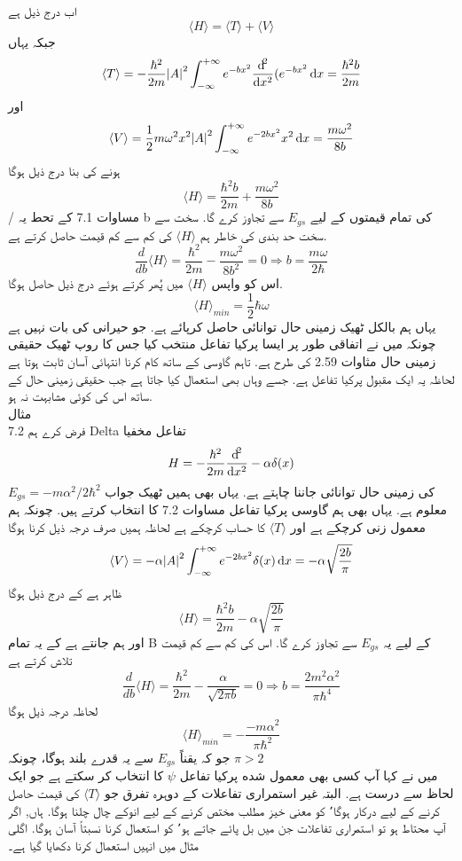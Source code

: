 اب درج ذیل ہے
 \[ \langle H \rangle=\langle T \rangle + \langle V \rangle\]
جبکہ یہاں
\[\langle T \rangle=-\frac{\hbar^{2}}{2m}\abs{A}^{2}\int_{-\infty}^{+\infty}e^{-bx^{2}}\frac{\dif^{2}}{\dif{x^{2}}}(e^{-bx^{2}}\dif{x}=\frac{\hbar^{2}b}{2m}\]
اور
\[\langle V\rangle=\frac{1}{2}m\omega^{2}x^{2}\abs{A}^{2}\int_{-\infty}^{+\infty}e^{-2bx^{2}}x^{2}\dif{x}=\frac{m\omega^{2}}{8b}\]
ہونے کی بنا درج ذیل ہوگا
\[ \langle H \rangle=\frac{\hbar^{2}b}{2m}+\frac{m\omega^{2}}{8b}\]
/
مساوات 7.1 کے تحط یہ b کی تمام قیمتوں کے لیے
\(E_{gs}\)
 سے تجاوز کرے گا. سخت سے سخت حد بندی کی خاطر ہم
 \( \langle H\rangle\)
 کی کم سے کم قیمت حاصل کرتے ہے.
\[\frac{d}{db}\langle H\rangle=\frac{\hbar^{2}}{2m}-\frac{m\omega^{2}}{8b^{2}}=0\Rightarrow b=\frac{m\omega}{2\hbar}\]
اس کو واپس
 \( \langle H\rangle \)
میں پُھر کرتے ہوئے درج ذیل حاصل ہوگا.
 \[\langle H\rangle _{min} =\frac{1}{2}\hbar\omega\]
یہاں ہم بالکل ٹھیک زمینی حال توانائی حاصل کرپائے ہے. جو حیرانی کی بات نہیں ہے چونکہ میں نے اتفاقی طور پر ایسا پرکیا تفاعل منتخب کیا جس کا روپ ٹھیک حقیقی  زمینی حال مثاوات 2.59 کی طرح ہے.   تاہم گاوسی کے ساتھ کام کرنا انتہائی آسان ثابت ہوتا ہے لحاظہ یہ ایک مقبول پرکیا تفاعل ہے. جسے وہاں بھی استعمال کیا جاتا ہے جب حقیقی زمینی حال کے ساتھ اس کی کوئی مشابہت نہ ہو.\\
مثال \\7.2
فرض کرے ہم Delta تفاعل مخفیا
\[H=-\frac{\hbar^{2}}{2m}\frac{\dif^{2}}{\dif{x^{2}}}-\alpha\delta(x)\]
کی زمینی حال توانائی جاننا چاہتے ہے. یہاں بھی ہمیں ٹھیک جواب
\(E_{gs}=-m\alpha^{2}/2\hbar^{2}\)
معلوم ہے. یہاں بھی ہم گاوسی پرکیا تفاعل مساوات 7.2 کا انتخاب کرتے ہیں. چونکہ ہم معمول زنی کرچکے ہے اور  
\(\langle T\rangle\)
 کا حساب کرچکے ہے لحاظہ ہمیں صرف درجہ ذیل کرنا ہوگا
\[\langle V\rangle=-\alpha\abs{A}^{2}\int_{-\infty}^{+\infty}e^{-2bx^{2}}\delta(x)\dif{x}=-\alpha\sqrt{\frac{2b}{\pi}}\]
ظاہر ہے کے درج ذيل ہوگا
 \[\langle H\rangle=\frac{\hbar^{2}b}{2m}-\alpha\sqrt{\frac{2b}{\pi}}\]
اور ہم جانتے ہے کے یہ تمام B  کے لیے یہ
\( E_{gs}\)
 سے تجاوز کرے گا. اس کی کم سے كم قیمت تلاش کرتے ہے\\
\[\frac{d}{db}\langle H\rangle=\frac{\hbar^{2}}{2m}-\frac{\alpha}{\sqrt{2\pi b}}=0\Rightarrow b=\frac{2m^{2}\alpha^{2}}{\pi\hbar^{4}}\]
لحاظہ درجہ ذیل ہوگا 
 \[\langle H\rangle _{min} =-\frac{-m\alpha^{2}}{\pi\hbar^{2}}\]
جو کہ یقناً
\( E_{gs}\)
 سے یہ قدرے بلند ہوگا، چونکہ
\(\pi>2\) \\
میں نے کہا آپ کسی بھی معمول شده پرکیا تفاعل 
\(\psi\) 
کا انتخاب کر سکتے ہے جو ایک لحاظ سے درست ہے. البتہ غیر استمراری تفاعلات کے دوہرہ تفرق جو
\( \langle T \rangle\)
کی قیمت حاصل کرنے کے لیے درکار ہوگا٬ کو معنی خیز مطلب مختص کرنے کے لیے انوکے چال چلنا ہوگا. ہاں, اگر آپ محتاط ہو تو استمراری تفاعلات جن میں بل پائے جاتے ہو٬ کو استعمال کرنا نسبتاً آسان ہوگا. اگلی مثال میں انہیں استعمال کرنا دکھایا گیا ہے۔


